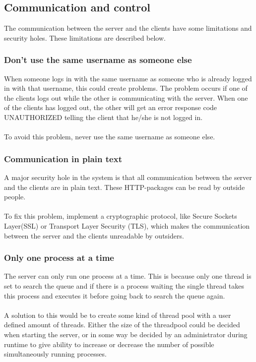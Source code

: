 \subsection{Communication and control}
The communication between the server and the clients have some limitations and security holes. These limitations are described below.

\subsubsection{Don't use the same username as someone else}
When someone logs in with the same username as someone who is already logged in with that username, this could create problems. The problem occurs if one of the clients logs out while the other is communicating with the server. When one of the clients has logged out, the other will get an error response code UNAUTHORIZED telling the client that he/she is not logged in.\\
\\
To avoid this problem, never use the same username as someone else.
\subsubsection{Communication in plain text}
A major security hole in the system is that all communication between the server and the clients are in plain text. These HTTP-packages can be read by outside people.\\
\\
To fix this problem, implement a cryptographic protocol, like Secure Sockets Layer(SSL) or Transport Layer Security (TLS), which makes the communication between the server and the clients unreadable by outsiders.
\subsubsection{Only one process at a time}
The server can only run one process at a time. This is because only one thread is set to search the queue and if there is a process waiting the single thread takes this process and executes it before going back to search the queue again.\\
\\
A solution to this would be to create some kind of thread pool with a user defined amount of threads. Either the size of the threadpool could be decided when starting the server, or in some way be decided by an administrator during runtime to give ability to increase or decrease the number of possible simultaneously running processes.
